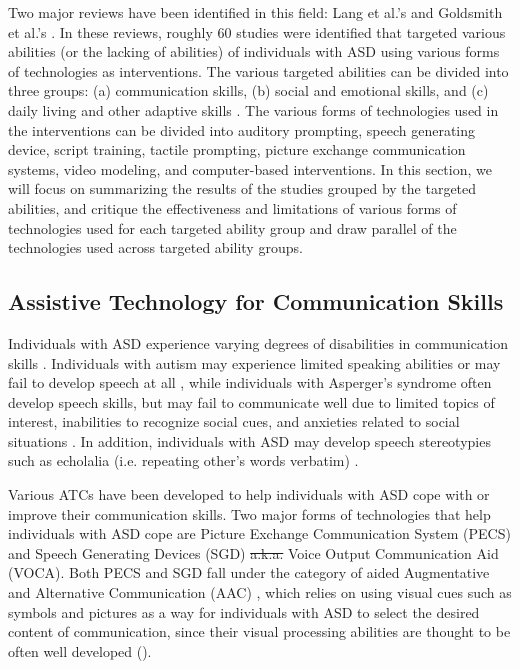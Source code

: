 \documentclass{ut-thesis}
\providecommand{\DIFaddtex}[1]{{\protect\color{blue}\uwave{#1}}} %
\providecommand{\DIFdeltex}[1]{{\protect\color{red}\sout{#1}}}                      %
\providecommand{\DIFaddbegin}{} %
\providecommand{\DIFaddend}{} %
\providecommand{\DIFdelbegin}{} %
\providecommand{\DIFdelend}{} %
\providecommand{\DIFadd}[1]{\texorpdfstring{\DIFaddtex{#1}}{#1}} %
\providecommand{\DIFdel}[1]{\texorpdfstring{\DIFdeltex{#1}}{}} %
\begin{document}
Two major reviews have been identified in this field: Lang et al.'s \cite{lang2014assistive} and Goldsmith et al.'s \cite{goldsmith2004use}.  In these reviews, roughly 60 studies were identified that targeted various abilities (or the lacking of abilities) of individuals with ASD using various forms of technologies as interventions.  The various targeted abilities can be divided into three groups: (a) communication skills, (b) social and emotional skills, and (c) daily living and other adaptive skills \cite{lang2014assistive}.  The various forms of technologies used in the interventions can be divided into auditory prompting, speech generating device, script training, tactile prompting, picture exchange communication systems, video modeling, and computer-based interventions.  In this section, we will focus on summarizing the results of the studies grouped by the targeted abilities, and critique the effectiveness and limitations of various forms of technologies used for each targeted ability group and draw parallel of the technologies used across targeted ability groups.

\subsection{Assistive Technology for Communication Skills}
Individuals with ASD experience varying degrees of disabilities in communication skills \cite{howlin2003outcome}.  Individuals with autism may experience limited speaking abilities or may fail to develop speech at all \cite{weitz1997aac}, while individuals with Asperger's syndrome often develop speech skills, but may fail to communicate well due to limited topics of interest, inabilities to recognize social cues, and anxieties related to social situations \cite{scheuermann2002teaching}.  In addition, individuals with ASD may develop speech stereotypies such as echolalia (i.e. repeating other's words verbatim) \cite{sigafoos2007assessing}.

Various ATCs have been developed to help individuals with ASD cope with or improve their communication skills.  Two major forms of technologies that help individuals with ASD cope are Picture Exchange Communication System (PECS) and Speech Generating Devices (SGD) \DIFdelbegin \DIFdel{a.k.a. }\DIFdelend \DIFaddbegin \DIFadd{(also known as }\DIFaddend Voice Output Communication Aid (VOCA)\DIFaddbegin \DIFadd{)}\DIFaddend .  Both PECS and SGD fall under the category of aided Augmentative and Alternative Communication (AAC) \cite{sigafoos2001conditional}, which relies on using visual cues such as symbols and pictures as a way for individuals with ASD to select the desired content of communication, since their visual processing abilities are thought to be often well developed (\cite{mirenda2001autism, shane2012applying}).
\end{document}
